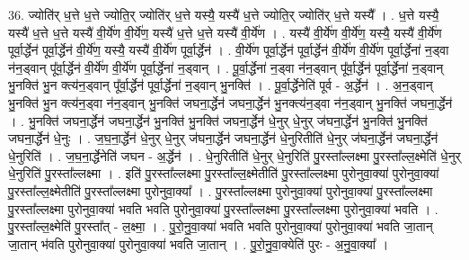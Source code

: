 \documentclass[17pt]{extarticle}
\begin{document}
36. ज्योति॑र् ध॒त्ते ध॒त्ते ज्योति॒र् ज्योति॑र् ध॒त्ते यस्यै॒ यस्यै॑ ध॒त्ते ज्योति॒र् ज्योति॑र् ध॒त्ते यस्यै᳚ । . ध॒त्ते यस्यै॒ यस्यै॑ ध॒त्ते ध॒त्ते यस्यै॑ वी॒र्ये॑ण वी॒र्ये॑ण॒ यस्यै॑ ध॒त्ते ध॒त्ते यस्यै॑ वी॒र्ये॑ण । . यस्यै॑ वी॒र्ये॑ण वी॒र्ये॑ण॒ यस्यै॒ यस्यै॑ वी॒र्ये॑ण पूर्वा॒र्द्धेन॑ पूर्वा॒र्द्धेन॑ वी॒र्ये॑ण॒ यस्यै॒ यस्यै॑ वी॒र्ये॑ण पूर्वा॒र्द्धेन॑ । . वी॒र्ये॑ण पूर्वा॒र्द्धेन॑ पूर्वा॒र्द्धेन॑ वी॒र्ये॑ण वी॒र्ये॑ण पूर्वा॒र्द्धेना॑ न॒ड्वा न॑न॒ड्वान् पू᳚र्वा॒र्द्धेन॑ वी॒र्ये॑ण वी॒र्ये॑ण पूर्वा॒र्द्धेना॑ न॒ड्वान् । . पू॒र्वा॒र्द्धेना॑ न॒ड्वा न॑न॒ड्वान् पू᳚र्वा॒र्द्धेन॑ पूर्वा॒र्द्धेना॑ न॒ड्वान् भु॒नक्ति॑ भु॒न क्त्य॑न॒ड्वान् पू᳚र्वा॒र्द्धेन॑ पूर्वा॒र्द्धेना॑ न॒ड्वान् भु॒नक्ति॑ । . पू॒र्वा॒र्द्धेनेति॑ पूर्व - अ॒र्द्धेन॑ । . अ॒न॒ड्वान् भु॒नक्ति॑ भु॒न क्त्य॑न॒ड्वा न॑न॒ड्वान् भु॒नक्ति॑ जघना॒र्द्धेन॑ जघना॒र्द्धेन॑ भु॒नक्त्य॑न॒ड्वा न॑न॒ड्वान् भु॒नक्ति॑ जघना॒र्द्धेन॑ । . भु॒नक्ति॑ जघना॒र्द्धेन॑ जघना॒र्द्धेन॑ भु॒नक्ति॑ भु॒नक्ति॑ जघना॒र्द्धेन॑ धे॒नुर् धे॒नुर् ज॑घना॒र्द्धेन॑ भु॒नक्ति॑ भु॒नक्ति॑ जघना॒र्द्धेन॑ धे॒नुः । . ज॒घ॒ना॒र्द्धेन॑ धे॒नुर् धे॒नुर् ज॑घना॒र्द्धेन॑ जघना॒र्द्धेन॑ धे॒नुरितीति॑ धे॒नुर् ज॑घना॒र्द्धेन॑ जघना॒र्द्धेन॑ धे॒नुरिति॑ । . ज॒घ॒ना॒र्द्धेनेति॑ जघन - अ॒र्द्धेन॑ । . धे॒नुरितीति॑ धे॒नुर् धे॒नुरिति॑ पु॒रस्ता᳚ल्लक्ष्मा पु॒रस्ता᳚ल्ल॒क्ष्मेति॑ धे॒नुर् धे॒नुरिति॑ पु॒रस्ता᳚ल्लक्ष्मा । . इति॑ पु॒रस्ता᳚ल्लक्ष्मा पु॒रस्ता᳚ल्ल॒क्ष्मेतीति॑ पु॒रस्ता᳚ल्लक्ष्मा पुरोनुवा॒क्या॑ पुरोनुवा॒क्या॑ पु॒रस्ता᳚ल्ल॒क्ष्मेतीति॑ पु॒रस्ता᳚ल्लक्ष्मा पुरोनुवा॒क्या᳚ । . पु॒रस्ता᳚ल्लक्ष्मा पुरोनुवा॒क्या॑ पुरोनुवा॒क्या॑ पु॒रस्ता᳚ल्लक्ष्मा पु॒रस्ता᳚ल्लक्ष्मा पुरोनुवा॒क्या॑ भवति भवति पुरोनुवा॒क्या॑ पु॒रस्ता᳚ल्लक्ष्मा पु॒रस्ता᳚ल्लक्ष्मा पुरोनुवा॒क्या॑ भवति । . पु॒रस्ता᳚ल्ल॒क्ष्मेति॑ पु॒रस्ता᳚त् - ल॒क्ष्मा॒ । . पु॒रो॒नु॒वा॒क्या॑ भवति भवति पुरोनुवा॒क्या॑ पुरोनुवा॒क्या॑ भवति जा॒तान् जा॒तान् भ॑वति पुरोनुवा॒क्या॑ पुरोनुवा॒क्या॑ भवति जा॒तान् । . पु॒रो॒नु॒वा॒क्येति॑ पुरः - अ॒नु॒वा॒क्या᳚ । \newline
\end{document}
